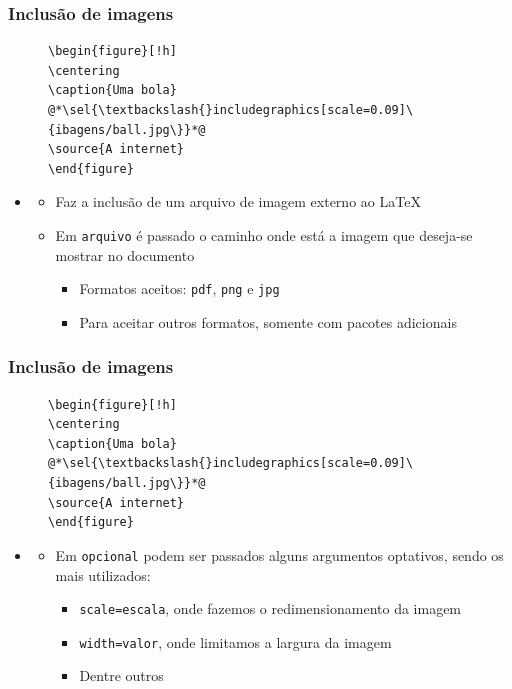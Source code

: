 \begin{frame}[fragile] \frametitle{Inclusão de imagens}
\begin{figure}[!t]
\begin{lstlisting}
\begin{figure}[!h]
\centering
\caption{Uma bola}
@*\sel{\textbackslash{}includegraphics[scale=0.09]\{ibagens/ball.jpg\}}*@
\source{A internet}
\end{figure}
\end{lstlisting}
\end{figure}

\begin{itemize}
	\item {}
	\begin{itemize}
		\item Faz a inclusão de um arquivo de imagem externo ao LaTeX
		\item Em \texttt{arquivo} é passado o caminho onde está a imagem que deseja-se mostrar no documento
		\begin{itemize}
			\item Formatos aceitos: \texttt{pdf}, \texttt{png} e \texttt{jpg}
			\item Para aceitar outros formatos, somente com pacotes adicionais
		\end{itemize}
	\end{itemize}
\end{itemize}
\end{frame}

\begin{frame}[fragile] \frametitle{Inclusão de imagens}
\begin{figure}[!t]
\begin{lstlisting}
\begin{figure}[!h]
\centering
\caption{Uma bola}
@*\sel{\textbackslash{}includegraphics[scale=0.09]\{ibagens/ball.jpg\}}*@
\source{A internet}
\end{figure}
\end{lstlisting}
\end{figure}

\begin{itemize}
	\item {}
	\begin{itemize}
		\item Em \texttt{opcional} podem ser passados alguns argumentos optativos, sendo os mais utilizados:
		\begin{itemize}
			\item \texttt{scale=escala}, onde fazemos o redimensionamento da imagem
			\item \texttt{width=valor}, onde limitamos a largura da imagem
			\item Dentre outros
		\end{itemize}
	\end{itemize}
\end{itemize}
\end{frame}

